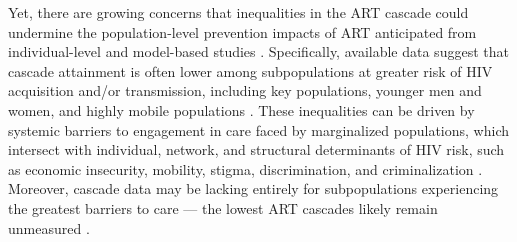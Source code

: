 \par
Yet, there are growing concerns that inequalities in the ART cascade
could undermine the population-level prevention impacts of ART
anticipated from individual-level and model-based studies
\cite{Baral2019,Green2020,Maheu-Giroux2024}.
Specifically, available data suggest that cascade attainment is often lower
among subpopulations at greater risk of HIV acquisition and/or transmission,
including key populations, younger men and women, and highly mobile populations
\cite{Hakim2018,Green2020}.
These inequalities can be driven by
systemic barriers to engagement in care faced by marginalized populations,
which intersect with individual, network, and structural determinants of HIV risk,
such as economic insecurity, mobility, stigma, discrimination, and criminalization
\cite{Wanyenze2016,Schwartz2017,Schmidt-Sane2022}.
Moreover, cascade data may be lacking entirely
for subpopulations experiencing the greatest barriers to care
--- \ie the lowest ART cascades likely remain unmeasured \cite{Hakim2018}.

